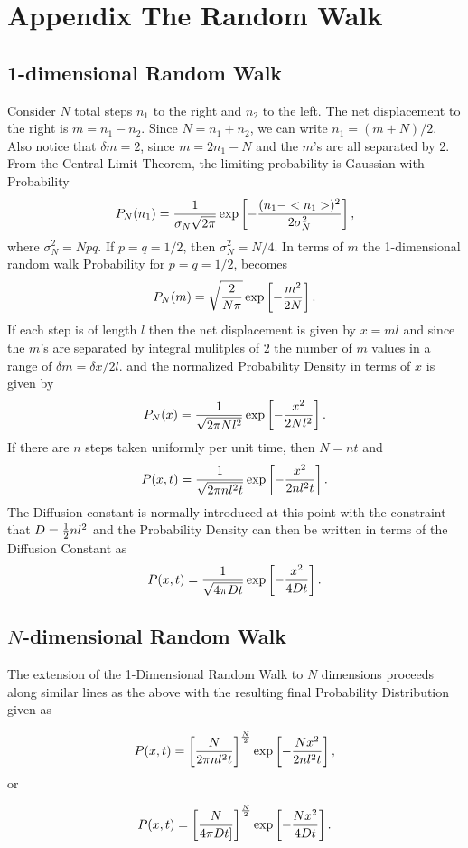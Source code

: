 

\section{Appendix The Random Walk}

\subsection{1-dimensional Random Walk}
Consider $N$ total steps $n_1$ to the right and $n_2$ to the left.
The net displacement to the right is $m = n_1 - n_2$. Since $N = n_1 + n_2$,
we can write $n_1 = (m + N)/2$. Also notice that $\delta m = 2$, since
$m = 2n_1 - N$ and the $m$'s are all separated by 2. 
From the Central Limit Theorem, the 
limiting probability is Gaussian with Probability 
$$P_N(n_1) = {1\over \sigma_N\sqrt{2\pi}} 
\exp\left[-{(n_1 - <n_1>)^2\over2\sigma_N^2}\right],$$
where $\sigma_N^2 = Npq$. If $p = q = 1/2$, then $\sigma_N^2 = N/4$.
In terms of $m$ the 1-dimensional random walk Probability for 
$p = q = 1/2$, becomes
$$P_N(m) = \sqrt{{2\over N\pi}} 
\exp\left[-{m^2\over2N}\right].$$
If each step is of length $l$ then the net displacement is given by
$x = ml$ and since the $m$'s are separated by integral mulitples of $2$
the number of $m$ values in a range of $\delta m = \delta x/2l$.
and the normalized Probability Density in terms of $x$ is given by
$$P_N(x) = {1\over\sqrt{2\pi Nl^2} } 
\exp\left[-{x^2\over2Nl^2}\right].$$
If there are $n$ steps taken uniformly per unit time, then $N = nt$ and
$$P(x,t) = {1\over\sqrt{2\pi nl^2t} } 
\exp\left[-{x^2\over2 nl^2t}\right].$$
The Diffusion constant is normally introduced at this point with the 
constraint that $D = {1\over2} nl^2$ and the Probability Density can then 
be written in terms of the Diffusion Constant as 
$$P(x,t) = {1\over\sqrt{4\pi Dt} } 
\exp\left[-{x^2\over4 Dt}\right].$$


\subsection{$N$-dimensional Random Walk}

The extension of the 1-Dimensional Random Walk to $N$ dimensions
proceeds along similar lines as the above with the resulting final 
Probability Distribution given as 

$$P(x,t) = \left[N\over 2\pi nl^2t \right]^{N\over2}  
\exp\left[-{Nx^2\over2 nl^2t}\right],$$ or

$$P(x,t) = \left[N\over 4\pi Dt] \right]^{N\over2}
\exp\left[-{Nx^2\over 4Dt}\right].$$

